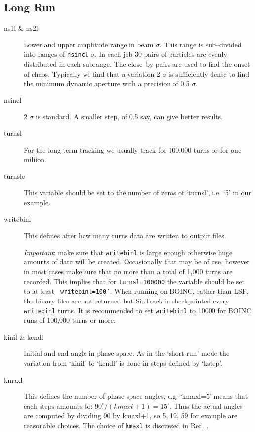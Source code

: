 \documentclass{cernatsnote}
\begin{document}
\subsection{Long Run}
\label{sec:run_six:longrun}
\begin{description}
\item [ns1l \& ns2l]
  Lower and upper amplitude range in beam $\sigma$. This range is
  sub--divided into ranges of {\tt nsincl} $\sigma$. In each job 30 pairs of
  particles are evenly distributed in each subrange. The
  close--by pairs are used to find the onset of chaos. Typically we
  find that a variation 2 $\sigma$ is sufficiently dense to find the
  minimum dynamic aperture with a precision of 0.5 $\sigma$.
\item [nsincl] 2 $\sigma$ is standard. A smaller step, of 0.5 say, 
can give better results.
\item [turnsl]
  For the long term tracking we usually track for 100,000 turns or for
one miliion.
\item [turnsle]
  This variable should be set to the number of zeros of `turnsl',
  i.e. `5' in our example. 
\item [writebinl]
  This defines after how many turns data are written to output
  files.

  \emph{Important}: make sure that {\tt writebinl} is large enough
  otherwise huge amounts of data will be created. Occasionally that
  may be of use, however in most cases make sure that no more than a total of
  1,000 turns are recorded. This implies that for
  {\tt turnsl=100000} the variable should be set to at least {\tt
  writebinl=100'}.  When running on BOINC, rather than LSF, the binary files
  are not returned but SixTrack is checkpointed every {\tt writebinl} turns.
  It is recommended to set {\tt writebinl} to 10000 for BOINC runs of 100,000
  turns or more.
\item[kinil \& kendl]
  Initial and end angle in phase space. As in the `short run' mode
  the variation from `kinil' to `kendl' is done in steps defined by
  `kstep'. 
\item [kmaxl]
  This defines the number of phase space angles, e.g. `kmaxl=5'
  means that each steps amounts to: $90^\circ/(kmaxl+1)=15^\circ$.
  Thus the actual angles are computed by dividing 90
  by kmaxl+1, so 5, 19, 59 for example are reasonable choices.
  The choice of {\tt kmaxl} is discussed in Ref.~\cite{fandmpaper}.
\end{description}
\end{document}

